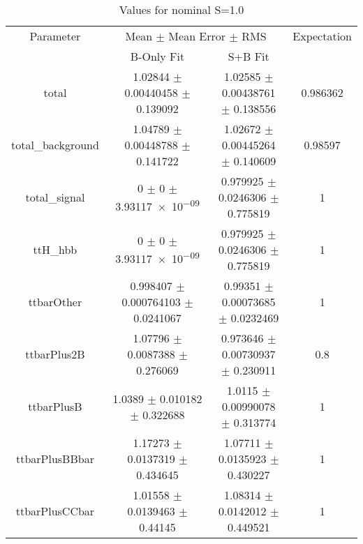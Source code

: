 \begin{table}
\centering
\caption{Values for nominal S=1.0}
\begin{tabular}{cccc}
\toprule
Parameter & \multicolumn{2}{c}{Mean $\pm$ Mean Error $\pm$ RMS} & Expectation\\
 & B-Only Fit & S+B Fit & \\
\midrule
total & \num{1.02844} $\pm$ \num{0.00440458} $\pm$ \num{0.139092} & \num{1.02585} $\pm$ \num{0.00438761} $\pm$ \num{0.138556} & \num{0.986362}\\
total\_background & \num{1.04789} $\pm$ \num{0.00448788} $\pm$ \num{0.141722} & \num{1.02672} $\pm$ \num{0.00445264} $\pm$ \num{0.140609} & \num{0.98597}\\
total\_signal & \num{0} $\pm$ \num{0} $\pm$ \num{3.93117e-09} & \num{0.979925} $\pm$ \num{0.0246306} $\pm$ \num{0.775819} & \num{1}\\
ttH\_hbb & \num{0} $\pm$ \num{0} $\pm$ \num{3.93117e-09} & \num{0.979925} $\pm$ \num{0.0246306} $\pm$ \num{0.775819} & \num{1}\\
ttbarOther & \num{0.998407} $\pm$ \num{0.000764103} $\pm$ \num{0.0241067} & \num{0.99351} $\pm$ \num{0.00073685} $\pm$ \num{0.0232469} & \num{1}\\
ttbarPlus2B & \num{1.07796} $\pm$ \num{0.0087388} $\pm$ \num{0.276069} & \num{0.973646} $\pm$ \num{0.00730937} $\pm$ \num{0.230911} & \num{0.8}\\
ttbarPlusB & \num{1.0389} $\pm$ \num{0.010182} $\pm$ \num{0.322688} & \num{1.0115} $\pm$ \num{0.00990078} $\pm$ \num{0.313774} & \num{1}\\
ttbarPlusBBbar & \num{1.17273} $\pm$ \num{0.0137319} $\pm$ \num{0.434645} & \num{1.07711} $\pm$ \num{0.0135923} $\pm$ \num{0.430227} & \num{1}\\
ttbarPlusCCbar & \num{1.01558} $\pm$ \num{0.0139463} $\pm$ \num{0.44145} & \num{1.08314} $\pm$ \num{0.0142012} $\pm$ \num{0.449521} & \num{1}\\
\bottomrule
\end{tabular}
\end{table}